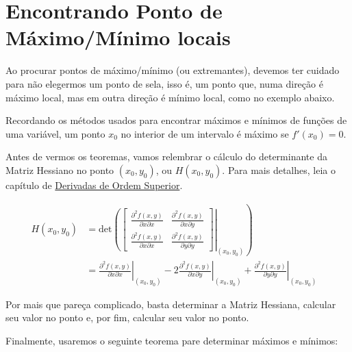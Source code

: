 \documentclass[
  portuguese,
  letterpaper,
  DIV=11,
  numbers=noendperiod]{scrreport}
\begin{document}
\section{Encontrando Ponto de Máximo/Mínimo
locais}\label{encontrando-ponto-de-muxe1ximomuxednimo-locais}

Ao procurar pontos de máximo/mínimo (ou extremantes), devemos ter
cuidado para não elegermos um ponto de sela, isso é, um ponto que, numa
direção é máximo local, mas em outra direção é mínimo local, como no
exemplo abaixo.

Recordando os métodos usados para encontrar máximos e mínimos de funções
de uma variável, um ponto \(x_0\) no interior de um intervalo é máximo
se \(f'(x_0)=0\).

Antes de vermos os teoremas, vamos relembrar o cálculo do determinante
da Matriz Hessiano no ponto \((x_0, y_0)\), ou \(H(x_0, y_0)\). Para
mais detalhes, leia o capítulo de
\hyperref[derivadas-de-ordem-superior]{Derivadas de Ordem Superior}.

\[
\begin{aligned}
H(x_0, y_0) 
& = \left. \mathrm{det} \left( \begin{bmatrix} \frac{\partial^2 f(x,y)}{\partial x\partial x} & \frac{\partial^2f(x,y)}{\partial x\partial y}\\ 
\frac{\partial^2f(x,y)}{\partial x\partial x} & \frac{\partial^2f(x,y)}{\partial y \partial y} \end{bmatrix} 
\right |_{(x_0,y_0)} \right )  &\\
& = \left.\frac{\partial^2f(x,y)}{\partial x\partial x}\right \rvert_{(x_0,y_0)} -2\left.\frac{\partial^2f(x,y)}{\partial x\partial y}\right \rvert_{(x_0,y_0)}+\left.\frac{\partial^2f(x,y)}{\partial y\partial y}\right \rvert_{(x_0,y_0)}\end{aligned}
\]

Por mais que pareça complicado, basta determinar a Matriz Hessiana,
calcular seu valor no ponto e, por fim, calcular seu valor no ponto.

Finalmente, usaremos o seguinte teorema pare determinar máximos e
mínimos:
\end{document}

